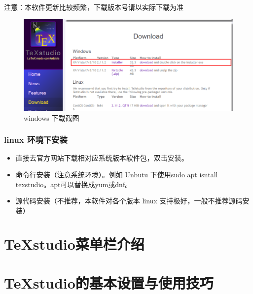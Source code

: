 \documentclass[14pt,notheorems]{beamer}
\begin{document}
\begin{frame}
	注意：本软件更新比较频繁，下载版本号请以实际下载为准
	\begin{figure}
		\centering
		\includegraphics[width=0.7\linewidth]{Windows_install}
		\caption{windows 下载截图}
		\label{fig:windowsinstall}
	\end{figure}
\end{frame}
\begin{frame}
	\frametitle{linux 环境下安装}
	\begin{itemize}
		\item 直接去官方网站下载相对应系统版本软件包，双击安装。
		\item 命令行安装（注意系统环境）。例如 Unbutu 下使用sudo apt isntall texstudio。apt可以替换成yum或dnf。
		\item 源代码安装（不推荐，本软件对各个版本 linux 支持极好，一般不推荐源码安装）
	\end{itemize}
\end{frame}
\section{\TeX studio菜单栏介绍}
\section{\TeX studio的基本设置与使用技巧}
\end{document}
